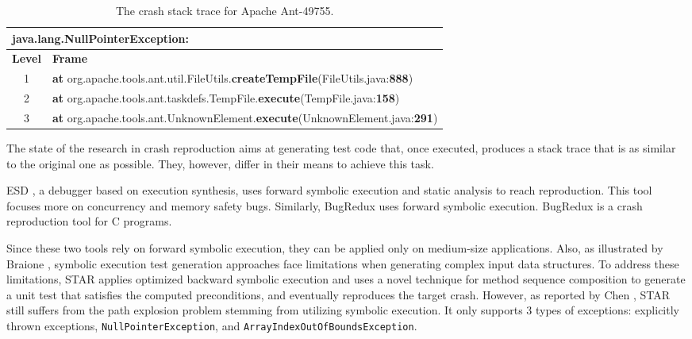 \begin{table*}[t]
\centering
\caption{The crash stack trace for Apache Ant-49755.}
\label{tab:ant49755}
\begin{tabular}{c|l}
\multicolumn{2}{l}{java.lang.\textbf{NullPointerException}:}\\
\hline
\textbf{Level} & \textbf{Frame} \\
\hline
1 & \textbf{at} org.apache.tools.ant.util.FileUtils.\textbf{createTempFile}(FileUtils.java:\textbf{888})\\
2 & \textbf{at} org.apache.tools.ant.taskdefs.TempFile.\textbf{execute}(TempFile.java:\textbf{158})\\
3 & \textbf{at} org.apache.tools.ant.UnknownElement.\textbf{execute}(UnknownElement.java:\textbf{291}) \\
\end{tabular}
\end{table*}

The state of the research in crash reproduction \cite{Zamfir2010, jin2012bugredux, BPT17concrash, soltani2017, Nayrolles2017, Xuan2015, Chen2015} aims at generating test code that, once executed, produces a stack trace that is as similar to the original one as possible. They, however, differ in their means to achieve this task. 

\textrm{ESD} \cite{Zamfir2010}, a debugger based on execution synthesis, uses forward symbolic execution and static analysis to reach reproduction. This tool focuses more on concurrency and memory safety bugs.
Similarly, \textrm{BugRedux} \cite{jin2012bugredux} uses forward symbolic execution. \textrm{BugRedux} is a crash reproduction tool for C programs.

Since these two tools rely on forward symbolic execution, they can be applied only on medium-size applications. Also, as illustrated by Braione \etal \cite{braione2017tardis}, symbolic execution test generation approaches face limitations when generating complex input data structures.
To address these limitations, \textrm{STAR} \cite{Chen2015} applies optimized backward symbolic execution and uses a novel technique for method sequence composition to generate a unit test that satisfies the computed preconditions, and eventually reproduces the target crash. 
However, as reported by Chen \etal \cite{Chen2015}, \textrm{STAR} still suffers from the path explosion problem stemming from utilizing symbolic execution. 
It only supports 3 types of exceptions: explicitly thrown exceptions, \texttt{NullPointerException}, and \texttt{ArrayIndexOutOfBoundsException}.  

